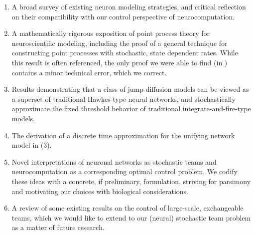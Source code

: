 \documentclass[12pt, oneside]{report}
\newcommand{\1}[1]{\mathbbm{1}_{\{#1\}}}
\theoremstyle{definition}
\begin{document}
\begin{enumerate}
    \item A broad survey of existing neuron modeling strategies, and critical reflection on their compatibility with
    our control perspective of neurocomputation.
    \item A mathematically rigorous exposition of point process theory for neuroscientific modeling, including the proof of a general technique
    for constructing point processes with stochastic, state dependent rates. While this result is often referenced, the only proof
    we were able to find (in \cite[theorem B.11]{Chevallier_Caceres_Doumic_Reynaud_Bouret_2015}) contains a minor technical error, which we correct.
    \item Results demonstrating that a class of jump-diffusion models can be viewed as a superset of traditional Hawkes-type neural networks,
    and stochastically approximate the fixed threshold behavior of traditional integrate-and-fire-type models.
    \item The derivation of a discrete time approximation for the unifying network model in (3).
    \item Novel interpretations of neuronal networks as stochastic teams and neurocomputation as a corresponding optimal control problem. We codify these ideas with a concrete, if preliminary, formulation,
    striving for parsimony and motivating our choices with biological considerations.
    \item A review of some existing results on the control of large-scale, exchangeable teams, which we would like to extend to our (neural) stochastic team problem as a matter of future research.
\end{enumerate}
\end{document}
